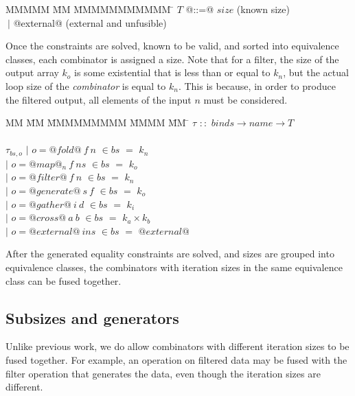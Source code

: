 \begin{tabbing}
MMMMM       \= MM \= MMMMMMMMMMM \= \kill
$T$          \> @::=@ \> $size$                                  \> (known size) \\
             \> $~|$  \> @external@                              \> (external and unfusible) \\
\end{tabbing}

Once the constraints are solved, known to be valid, and sorted into equivalence classes, each combinator is assigned a size.
Note that for a filter, the size of the output array $k_o$ is some existential that is less than or equal to $k_n$, but the actual loop size of the \emph{combinator} is equal to $k_n$.
This is because, in order to produce the filtered output, all elements of the input $n$ must be considered.


\begin{tabbing}
MM \= MM \= MMMMMMMMM \= MMMM \= MM \= \kill
$\tau$  \>$::$\> $binds \rightarrow name \rightarrow T$ \\
\\
$\tau_{bs,o}$    
            \> $|$ \> $o = @fold@~f~n$      \> $\in bs$ \> $=$ \> $k_n$ \\
            \> $|$ \> $o = @map@_n~f~ns$    \> $\in bs$ \> $=$ \> $k_o$ \\
            \> $|$ \> $o = @filter@~f~n$    \> $\in bs$ \> $=$ \> $k_n$ \\
            \> $|$ \> $o = @generate@~s~f$  \> $\in bs$ \> $=$ \> $k_o$ \\
            \> $|$ \> $o = @gather@~i~d$    \> $\in bs$ \> $=$ \> $k_i$ \\
            \> $|$ \> $o = @cross@~a~b$     \> $\in bs$ \> $=$ \> $k_a \times k_b$ \\
            \> $|$ \> $o = @external@~ins$  \> $\in bs$ \> $=$ \> $@external@$ \\
\end{tabbing}

After the generated equality constraints are solved, and sizes are grouped into equivalence classes, the combinators with iteration sizes in the same equivalence class can be fused together.

\subsection{Subsizes and generators}
Unlike previous work, we do allow combinators with different iteration sizes to be fused together.
For example, an operation on filtered data may be fused with the filter operation that generates the data, even though the iteration sizes are different.



